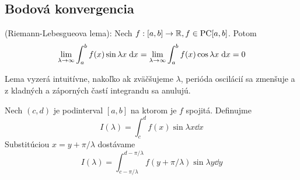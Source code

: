 
\subsection{Bodová konvergencia}
\begin{lema}
    (Riemann-Lebesgueova lema):
    Nech $f: [a,b]\rightarrow {\mathbb R}, f\in \mbox{PC}[a,b]$. Potom
    \begin{equation}
        \lim_{\lambda\rightarrow\infty} \int_a^b f(x) \sin \lambda x \; \mathrm{d} x=
        \lim_{\lambda\rightarrow\infty} \int_a^b f(x) \cos \lambda x \; \mathrm{d} x=
        0
    \end{equation}
\end{lema}

\begin{dokaz}
    Lema vyzerá intuitívne, nakoľko ak zväčšujeme $\lambda$,
    perióda oscilácií sa zmenšuje a 
    z kladných a záporných častí integrandu sa anulujú.

    \def\pil{\pi/\lambda}

    Nech $(c,d)$ je podinterval $[a,b]$ na ktorom je $f$ spojitá.
    Definujme 
    \begin{equation}
        I(\lambda) = \int_c^d f(x) \sin \lambda x \dd x
        \label{eq:riem_leb_I1}
    \end{equation}
    Substitúciou $x=y+\pil$ dostávame
    \begin{equation}
        I(\lambda) = \int_{c-\pil}^{d-\pil}
            f \left(y+\pil\right) \sin \lambda y \dd y
        \label{eq:riem_leb_I2}
    \end{equation}


\end{dokaz}
